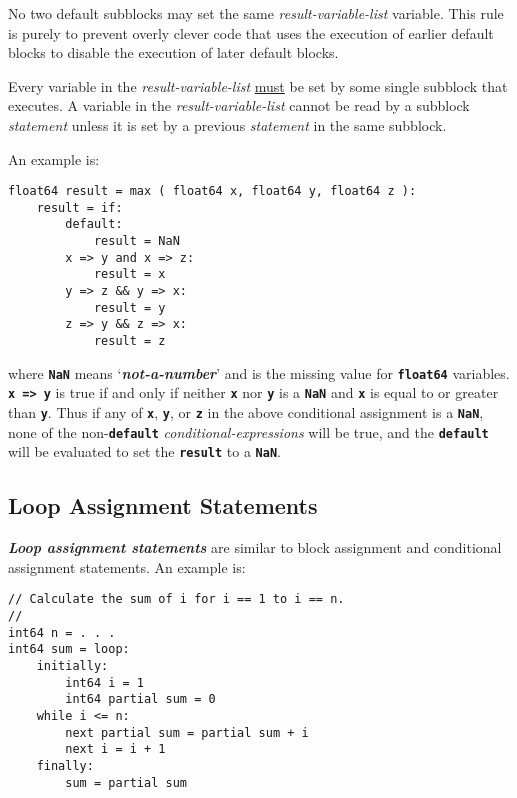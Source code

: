 \documentclass[12pt]{article}
\newcommand{\TT}[1]{{\tt \bfseries #1}}
\newcommand{\key}[1]{{\bf \em #1}\index{#1}}
\newcommand{\ikey}[2]{{\bf \em #1}\index{#2}}
\newenvironment{indpar}[1][0.3in]%
	{\begin{list}{}%
		     {\setlength{\itemsep}{0in}%
		      \setlength{\topsep}{0in}%
		      \setlength{\parsep}{1ex}%
		      \setlength{\labelwidth}{#1}%
		      \setlength{\leftmargin}{#1}%
		      \addtolength{\leftmargin}{\labelsep}}%
	 \item}%
	{\end{list}}
\begin{document}
No two default subblocks may set the same {\em result-variable-list}
variable.  This rule is purely to prevent overly clever code that
uses the execution of earlier default blocks to disable the
execution of later default blocks.

Every variable in the {\em result-variable-list} \underline{must} be set by some
single subblock that executes.  A variable in the
{\em result-variable-list} cannot be read by a subblock {\em statement}
unless it is set by a previous {\em statement} in the
same subblock.

An example is:
\begin{indpar}\begin{verbatim}
float64 result = max ( float64 x, float64 y, float64 z ):
    result = if:
        default:
            result = NaN
        x => y and x => z:
            result = x
        y => z && y => x:
            result = y
        z => y && z => x:
            result = z
\end{verbatim}\end{indpar}

where \TT{NaN} means `\key{not-a-number}' and is the missing
value for \TT{float64} variables.  \TT{x~=>~y} is true if
and only if neither \TT{x} nor \TT{y} is a \TT{NaN} and
\TT{x} is equal to or greater than \TT{y}.  Thus if any of
\TT{x}, \TT{y}, or \TT{z} in the above conditional assignment
is a \TT{NaN}, none of the non-\TT{default} {\em conditional-expressions}
will be true, and the \TT{default} will be evaluated to set
the \TT{result} to a \TT{NaN}.

\subsection{Loop Assignment Statements}
\label{LOOP-ASSIGNMENT-STATEMENTS}

\ikey{Loop assignment statements}{loop assignment}
are similar to block assignment
and conditional assignment statements.  An example is:
\begin{indpar}\begin{verbatim}
// Calculate the sum of i for i == 1 to i == n.
//
int64 n = . . .
int64 sum = loop:
    initially:
        int64 i = 1
        int64 partial sum = 0
    while i <= n:
        next partial sum = partial sum + i
        next i = i + 1
    finally:
        sum = partial sum
\end{verbatim}\end{indpar}
\end{document}
